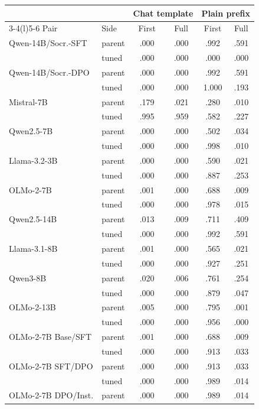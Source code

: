 \begin{table}[t]
\centering\scriptsize
\setlength{\tabcolsep}{2pt}
\begin{tabular}{@{}llcccc@{}}
\toprule
& & \multicolumn{2}{c}{Chat template} & \multicolumn{2}{c}{Plain prefix} \\
\cmidrule(lr){3-4}\cmidrule(l){5-6}
Pair & Side & First & Full & First & Full \\
\midrule
Qwen-14B/Socr.-SFT & parent & .000 & .000 & .992 & .591 \\
 & tuned & .000 & .000 & .000 & .000 \\
Qwen-14B/Socr.-DPO & parent & .000 & .000 & .992 & .591 \\
 & tuned & .000 & .000 & 1.000 & .193 \\
Mistral-7B & parent & .179 & .021 & .280 & .010 \\
 & tuned & .995 & .959 & .582 & .227 \\
Qwen2.5-7B & parent & .000 & .000 & .502 & .034 \\
 & tuned & .000 & .000 & .998 & .010 \\
Llama-3.2-3B & parent & .000 & .000 & .590 & .021 \\
 & tuned & .000 & .000 & .887 & .253 \\
OLMo-2-7B & parent & .001 & .000 & .688 & .009 \\
 & tuned & .000 & .000 & .978 & .015 \\
Qwen2.5-14B & parent & .013 & .009 & .711 & .409 \\
 & tuned & .000 & .000 & .992 & .591 \\
Llama-3.1-8B & parent & .001 & .000 & .565 & .021 \\
 & tuned & .000 & .000 & .927 & .251 \\
Qwen3-8B & parent & .020 & .006 & .761 & .254 \\
 & tuned & .000 & .000 & .879 & .047 \\
OLMo-2-13B & parent & .005 & .000 & .795 & .001 \\
 & tuned & .000 & .000 & .956 & .000 \\
OLMo-2-7B Base/SFT & parent & .001 & .000 & .688 & .009 \\
 & tuned & .000 & .000 & .913 & .033 \\
OLMo-2-7B SFT/DPO & parent & .000 & .000 & .913 & .033 \\
 & tuned & .000 & .000 & .989 & .014 \\
OLMo-2-7B DPO/Inst. & parent & .000 & .000 & .989 & .014 \\

\end{tabular}
\end{table}

